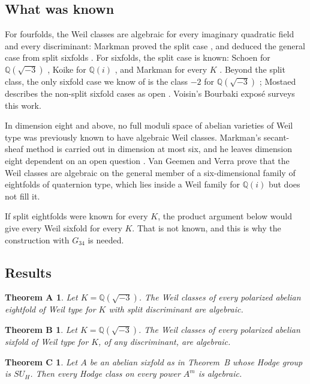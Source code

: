 \documentclass[11pt]{amsart}
\newtheorem*{theoremA}{Theorem A}
\newtheorem*{theoremB}{Theorem B}
\newtheorem*{theoremC}{Theorem C}
\theoremstyle{definition}
\theoremstyle{remark}
\newcommand{\Q}{\mathbb Q}
\begin{document}
\subsection{What was known}
For fourfolds, the Weil classes are algebraic for every imaginary quadratic field and every discriminant: Markman proved the split case \cite{Markman19}, and deduced the general case from split sixfolds \cite{Markman25}. For sixfolds, the split case is known: Schoen for $\Q(\sqrt{-3})$ \cite{Schoen98}, Koike for $\Q(i)$ \cite{Koike}, and Markman for every $K$ \cite[Theorem~1.5.1]{Markman25}. Beyond the split class, the only sixfold case we know of is the class $-2$ for $\Q(\sqrt{-3})$ \cite{SevernG32}; Mostaed describes the non-split sixfold cases as open \cite[Introduction]{Mostaed}. Voisin's Bourbaki expos\'e \cite{Voisin} surveys this work.

In dimension eight and above, no full moduli space of abelian varieties of Weil type was previously known to have algebraic Weil classes. Markman's secant-sheaf method is carried out in dimension at most six, and he leaves dimension eight dependent on an open question \cite[\S\S1, 12]{Markman25b}. Van Geemen and Verra \cite{vGV} prove that the Weil classes are algebraic on the general member of a six-dimensional family of eightfolds of quaternion type, which lies inside a Weil family for $\Q(i)$ but does not fill it.

If split eightfolds were known for every $K$, the product argument below would give every Weil sixfold for every $K$. That is not known, and this is why the construction with $G_{34}$ is needed.

\subsection{Results}

\begin{theoremA}
Let $K=\Q(\sqrt{-3})$. The Weil classes of every polarized abelian eightfold of Weil type for $K$ with split discriminant are algebraic.
\end{theoremA}

\begin{theoremB}
Let $K=\Q(\sqrt{-3})$. The Weil classes of every polarized abelian sixfold of Weil type for $K$, of any discriminant, are algebraic.
\end{theoremB}

\begin{theoremC}
Let $A$ be an abelian sixfold as in Theorem~B whose Hodge group is $SU_H$. Then every Hodge class on every power $A^m$ is algebraic.
\end{theoremC}
\end{document}
